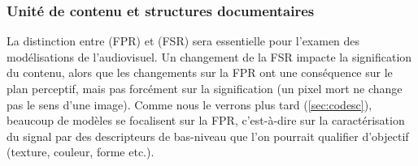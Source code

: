 



\subsubsection{Unité de contenu et structures documentaires}\label{sec:uc-sd}
La distinction entre  (FPR) et  (FSR) sera essentielle pour l'examen des modélisations de l'audiovisuel.
Un changement de la FSR impacte la signification du contenu, alors que les changements sur la FPR ont une conséquence sur le plan perceptif, mais pas forcément sur la signification (un pixel mort ne change pas le sens d'une image).
Comme nous le verrons plus tard (\ref{sec:codesc}), beaucoup de modèles se focalisent sur la FPR, c'est-à-dire sur la caractérisation du signal par des descripteurs de bas-niveau que l'on pourrait qualifier d'objectif (texture, couleur, forme etc.).

